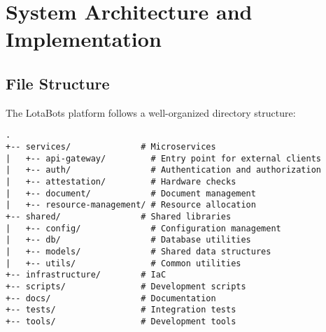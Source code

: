 \section{System Architecture and Implementation}

\subsection{File Structure}
The LotaBots platform follows a well-organized directory structure:

\begin{verbatim}
.
+-- services/              # Microservices
|   +-- api-gateway/         # Entry point for external clients
|   +-- auth/                # Authentication and authorization
|   +-- attestation/         # Hardware checks
|   +-- document/            # Document management
|   +-- resource-management/ # Resource allocation
+-- shared/                # Shared libraries
|   +-- config/              # Configuration management
|   +-- db/                  # Database utilities
|   +-- models/              # Shared data structures
|   +-- utils/               # Common utilities
+-- infrastructure/        # IaC
+-- scripts/               # Development scripts
+-- docs/                  # Documentation
+-- tests/                 # Integration tests
+-- tools/                 # Development tools
\end{verbatim}
